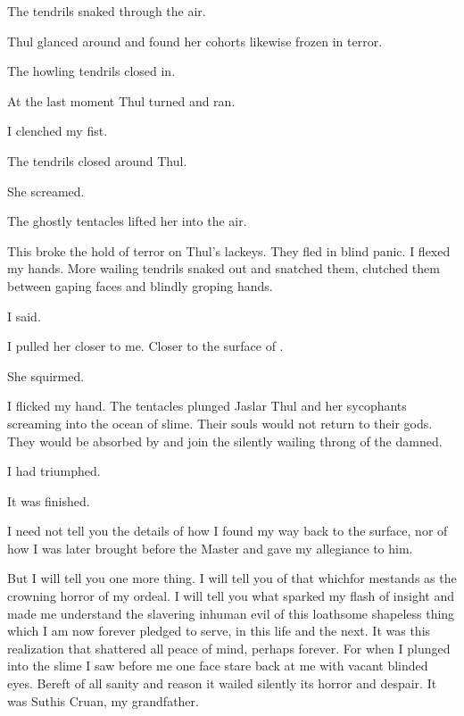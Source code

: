 \documentclass
  [a4paper,
   12pt,
   oneside
  ]%
  {article}
\begin{document}
The tendrils snaked through the air. 

Thul glanced around and found her cohorts likewise frozen in terror. 

The howling tendrils closed in. 

At the last moment Thul turned and ran. 

I clenched my fist. 

The tendrils closed around Thul. 

She screamed. 

The ghostly tentacles lifted her into the air. 

This broke the hold of terror on Thul's lackeys. 
They fled in blind panic. 
I flexed my hands.
More wailing tendrils snaked out and snatched them, clutched them between gaping faces and blindly groping hands. 

 I said.

I pulled her closer to me.
Closer to the surface of \Ubloth.

She squirmed. 


I flicked my hand.
The tentacles plunged Jaslar Thul and her sycophants screaming into the ocean of slime. 
Their souls would not return to their gods.
They would be absorbed by \Ubloth and join the silently wailing throng of the damned. 

I had triumphed. 

It was finished. 

I need not tell you the details of how I found my way back to the surface, nor of how I was later brought before the Master and gave my allegiance to him. 

But I will tell you one more thing. 
I will tell you of that which\dash for me\dash stands as the crowning horror of my ordeal. 
I will tell you what sparked my flash of insight and made me understand the slavering inhuman evil of this loathsome shapeless thing which I am now forever pledged to serve, in this life and the next. 
It was this realization that shattered all peace of mind, perhaps forever. 
For when I plunged into the slime I saw before me one face stare back at me with vacant blinded eyes. 
Bereft of all sanity and reason it wailed silently its horror and despair.
It was Suthis Cruan, my grandfather. 
\end{document}
